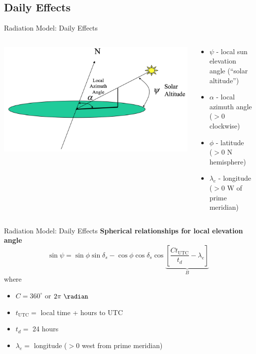 \subsection{Daily Effects}
\begin{frame}{Radiation Model: Daily Effects}
\begin{columns}[T]
    \begin{column}{.5\textwidth}
    \begin{minipage}[c][0.7\textheight][c]{\linewidth}
    \includegraphics[width=1\textwidth]{fig5}\\
    \end{minipage}
    \end{column}
    \begin{column}{.5\textwidth}
    \begin{minipage}[c][0.65\textheight][c]{\linewidth}
   \begin{itemize}
   	\item $\psi$ - local sun elevation angle (``solar altitude'')
   	\item $\alpha$ - local azimuth angle \\($>0$ clockwise)
   	\item $\phi$ - latitude \\($>0$ N hemisphere)
   	\item $\lambda_e$ - longitude \\($>0$ W of prime meridian)
   \end{itemize}
      \end{minipage}
    \end{column}
  \end{columns}
\end{frame}
\begin{frame}{Radiation Model: Daily Effects}
\textbf{Spherical relationships for local elevation angle}
	$$\sin \psi = \sin \phi \sin \delta_s - \cos\phi\cos \delta_s \cos \underbrace{\left[\frac{Ct_{\text{UTC}}}{t_d} - \lambda_e\right]}_{B}$$
	where
	\begin{itemize}
		\item $C=360^\circ$ or $2\pi\ \radian$
		\item $t_{\text{UTC}} =$ local time + hours to UTC
		\item $t_d =$ 24 hours 
		\item $\lambda_e =$ longitude ($>0$ west from prime meridian)
	\end{itemize}
\end{frame}
